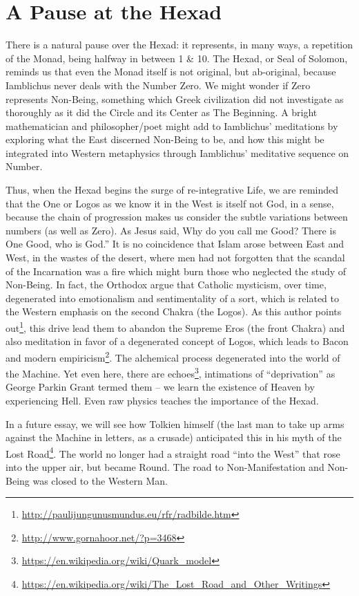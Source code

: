 \section{A Pause at the Hexad}

There is a natural pause over the Hexad: it represents, in many ways, a repetition of the Monad, being halfway in between 1 \& 10. The Hexad, or Seal of Solomon, reminds us that even the Monad itself is not original, but ab-original, because Iamblichus never deals with the Number Zero. We might wonder if Zero represents Non-Being, something which Greek civilization did not investigate as thoroughly as it did the Circle and its Center as The Beginning. A bright mathematician and philosopher/poet might add to Iamblichus' meditations by exploring what the East discerned Non-Being to be, and how this might be integrated into Western metaphysics through Iamblichus' meditative sequence on Number.

Thus, when the Hexad begins the surge of re-integrative Life, we are reminded that the One or Logos as we know it in the West is itself not God, in a sense, because the chain of progression makes us consider the subtle variations between numbers (as well as Zero). As Jesus said, Why do you call me Good? There is One Good, who is God.'' It is no coincidence that Islam arose between East and West, in the wastes of the desert, where men had not forgotten that the scandal of the Incarnation was a fire which might burn those who neglected the study of Non-Being. In fact, the Orthodox argue that Catholic mysticism, over time, degenerated into emotionalism and sentimentality of a sort, which is related to the Western emphasis on the second Chakra (the Logos). As this author points out\footnote{\url{http://paulijungunusmundus.eu/rfr/radbilde.htm}}, this drive lead them to abandon the Supreme Eros (the front Chakra) and also meditation in favor of a degenerated concept of Logos, which leads to Bacon and modern empiricism\footnote{\url{http://www.gornahoor.net/?p=3468}}. The alchemical process degenerated into the world of the Machine. Yet even here, there are echoes\footnote{\url{https://en.wikipedia.org/wiki/Quark\_model}}, intimations of ``deprivation'' as George Parkin Grant termed them -- we learn the existence of Heaven by experiencing Hell. Even raw physics teaches the importance of the Hexad.

In a future essay, we will see how Tolkien himself (the last man to take up arms against the Machine in letters, as a crusade) anticipated this in his myth of the Lost Road\footnote{\url{https://en.wikipedia.org/wiki/The\_Lost\_Road\_and\_Other\_Writings}}. The world no longer had a straight road ``into the West'' that rose into the upper air, but became Round. The road to Non-Manifestation and Non-Being was closed to the Western Man.

